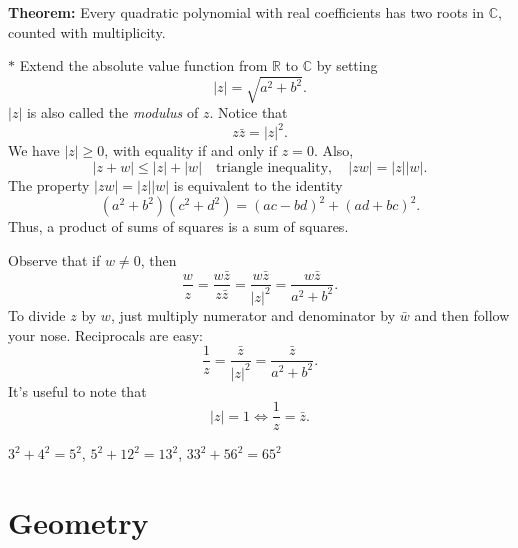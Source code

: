 \documentclass[12pt]{amsart}
\newcommand{\CC}{\mathbb{C}}
\newcommand{\RR}{\mathbb{R}}
\begin{document}
\textbf{Theorem:} Every quadratic polynomial with real coefficients has two roots in $\CC$, counted with multiplicity.

$*$ Extend the absolute value function from $\RR$ to $\CC$ by setting
\[
    |z| = \sqrt{a^2+b^2}.
\]
$|z|$ is also called the \emph{modulus} of $z$.
Notice that
\[
z\bar z = |z|^2.
\]
We have $|z|\geq 0$, with equality if and only if $z=0$. Also,
\[
    |z+w|\leq |z| + |w|\quad \text{triangle inequality},\quad |zw|=|z||w|.
\]
The property $|zw|=|z||w|$ is equivalent to the identity
\[
    (a^2+b^2)(c^2+d^2)=(ac-bd)^2 + (ad+bc)^2.
\]
Thus, a product of sums of squares is a sum of squares.

Observe that if $w\neq 0$, then
\[
    \frac wz = \frac{w\bar z}{z\bar z} = \frac{w\bar z}{|z|^2} = \frac{w\bar z}{a^2+b^2}.
\]
To divide $z$ by $w$, just multiply numerator and denominator by $\bar w$ and then follow your nose.
Reciprocals are easy:
\[
    \frac1z = \frac{\bar z}{|z|^2} = \frac{\bar z}{a^2+b^2}.
\]
It's useful to note that
\[
    |z|=1\Longleftrightarrow \frac1z=\bar z.
\]

$3^2+4^2=5^2$,  $5^2+12^2=13^2$, $33^2 + 56^2 = 65^2$


\section{Geometry}
\end{document}
